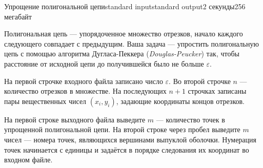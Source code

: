 \begin{problem}{Упрощение полигональной цепи}{standard input}{standard output}{2 секунды}{256 мегабайт}

Полигональная цепь — упорядоченное множество отрезков, начало каждого следующего совпадает с предыдущим.
Ваша задача — упростить полигональную цепь с помощью алгоритма Дугласа-Пеккера (\emph{Douglas-Peucker}) так,
чтобы расстояние от исходной цепи до получившейся было не больше $\varepsilon$.


\InputFile

На первой строчке входного файла записано число $\varepsilon$.
Во второй строчке $n$ — количество отрезков в множестве.
На последующих $n + 1$ строчках записаны пары вещественных чисел $(x_i, y_i)$, задающие координаты концов отрезков.

\OutputFile

На первой строке выходного файла выведите $m$ — количество точек в упрощенной полигональной цепи.
На второй строке через пробел выведите $m$ чисел — номера точек, являющихся вершинами выпуклой оболочки.
Нумерация точек начинается с единицы и задаётся в порядке следования их координат во входном файле.

\Examples

\begin{example}%
%
\end{example}

\end{problem}